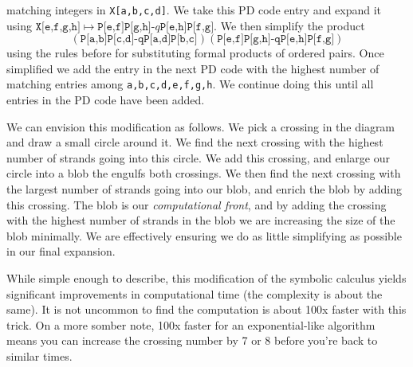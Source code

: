         matching integers in \texttt{X[a,b,c,d]}. We take this PD code entry
        and expand it using
        $\texttt{X[e,f,g,h]}\mapsto\texttt{P[e,f]P[g,h]-$q$P[e,h]P[f,g]}$. We
        then simplify the product
        \begin{equation}
            \nonumber
            (\texttt{P[a,b]P[c,d]-qP[a,d]P[b,c]})
            (\texttt{P[e,f]P[g,h]-qP[e,h]P[f,g]})
        \end{equation}
        using the rules before for substituting formal products of ordered
        pairs. Once simplified we add the entry in the next PD code with the
        highest number of matching entries among
        \texttt{a,b,c,d,e,f,g,h}. We continue doing this until all entries in
        the PD code have been added.
        \par\hfill\par
        We can envision this modification as follows. We pick a crossing in
        the diagram and draw a small circle around it. We find the next
        crossing with the highest number of strands going into this circle.
        We add this crossing, and enlarge our circle into a blob the engulfs
        both crossings. We then find the next crossing with the largest number
        of strands going into our blob, and enrich the blob by adding this
        crossing. The blob is our \textit{computational front}, and by
        adding the crossing with the highest number of strands in the blob we
        are increasing the size of the blob minimally. We are effectively
        ensuring we do as little simplifying as possible in our final
        expansion.
        \par\hfill\par
        While simple enough to describe, this modification of the symbolic
        calculus yields significant improvements in computational time (the
        complexity is about the same). It is not uncommon to find the
        computation is about 100x faster with this trick. On a more somber
        note, 100x faster for an exponential-like algorithm means you can
        increase the crossing number by 7 or 8 before you're back to similar
        times.
